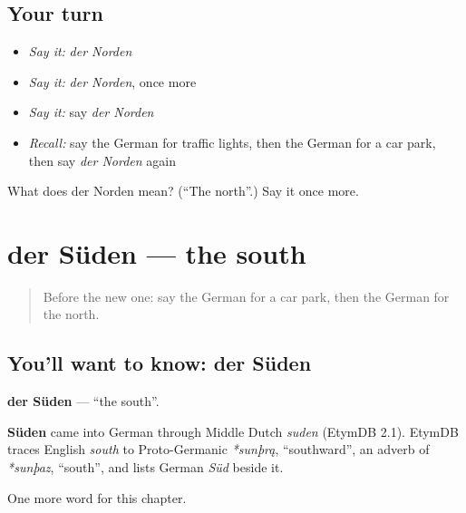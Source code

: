 \subsection*{Your turn}
\begin{itemize}
\raggedright
  \item \emph{Say it:} \emph{der Norden}
  \item \emph{Say it:} \emph{der Norden}, once more
  \item \emph{Say it:} say \emph{der Norden}
  \item \emph{Recall:} say the German for traffic lights, then the German for a car park, then say \emph{der Norden} again
\end{itemize}

\begin{tcolorbox}[breakable,colback=teal!4,colframe=teal!35!black,title={Before you move on}]
What does der Norden mean? (\textquotedblleft{}The north\textquotedblright{}.) Say it once more.
\end{tcolorbox}
\section[der Süden]{der Süden — the south}

\label{lesson:GE-C108-sueden}



\begin{quote}
Before the new one: say the German for a car park, then the German for the north.
\end{quote}

\subsection*{You'll want to know: der Süden}
\textbf{der Süden} — \textquotedblleft{}the south\textquotedblright{}.

\begin{cousinweb}
\textbf{Süden} came into German through Middle Dutch \emph{suden} (EtymDB 2.1). EtymDB traces English \emph{south} to Proto-Germanic \emph{*sunþrą}, \textquotedblleft{}southward\textquotedblright{}, an adverb of \emph{*sunþaz}, \textquotedblleft{}south\textquotedblright{}, and lists German \emph{Süd} beside it.
\end{cousinweb}

\begin{grammarlens}[title={What you've built}]
One more word for this chapter.
\end{grammarlens}

